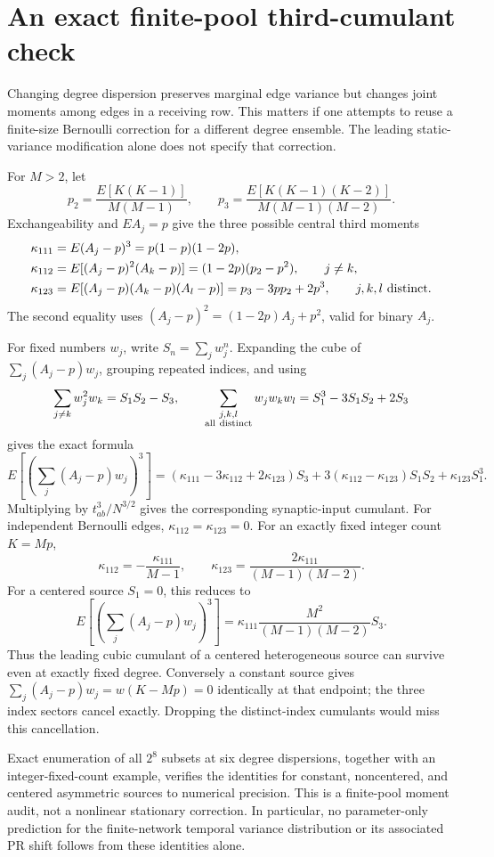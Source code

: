 \section{An exact finite-pool third-cumulant check}
\label{sec:degree-third-cumulant}

Changing degree dispersion preserves marginal edge variance but changes
joint moments among edges in a receiving row. This matters if one attempts
to reuse a finite-size Bernoulli correction for a different degree ensemble.
The leading static-variance modification alone does not specify that
correction.

For \(M>2\), let
\[
 p_2=\frac{E[K(K-1)]}{M(M-1)},\qquad
 p_3=\frac{E[K(K-1)(K-2)]}{M(M-1)(M-2)}.
\]
Exchangeability and \(E A_j=p\) give the three possible central third moments
\begin{align*}
 \kappa_{111}&=E(A_j-p)^3=p(1-p)(1-2p),\\
 \kappa_{112}&=E[(A_j-p)^2(A_k-p)]
            =(1-2p)(p_2-p^2),\qquad j\ne k,\\
 \kappa_{123}&=E[(A_j-p)(A_k-p)(A_l-p)]
            =p_3-3pp_2+2p^3,\qquad j,k,l\ {\rm distinct}.
\end{align*}
The second equality uses
\((A_j-p)^2=(1-2p)A_j+p^2\), valid for binary \(A_j\).

For fixed numbers \(w_j\), write \(S_n=\sum_jw_j^n\). Expanding the cube of
\(\sum_j(A_j-p)w_j\), grouping repeated indices, and using
\[
 \sum_{j\ne k}w_j^2w_k=S_1S_2-S_3,\qquad
 \sum_{\substack{j,k,l\\{\rm all\ distinct}}}w_jw_kw_l
 =S_1^3-3S_1S_2+2S_3
\]
gives the exact formula
\[
 E\left[\left(\sum_j(A_j-p)w_j\right)^3\right]
 =(\kappa_{111}-3\kappa_{112}+2\kappa_{123})S_3
  +3(\kappa_{112}-\kappa_{123})S_1S_2
  +\kappa_{123}S_1^3.
\]
Multiplying by \(t_{ab}^3/N^{3/2}\) gives the corresponding synaptic-input
cumulant. For independent Bernoulli edges,
\(\kappa_{112}=\kappa_{123}=0\). For an exactly fixed integer count \(K=Mp\),
\[
 \kappa_{112}=-\frac{\kappa_{111}}{M-1},\qquad
 \kappa_{123}=\frac{2\kappa_{111}}{(M-1)(M-2)}.
\]
For a centered source \(S_1=0\), this reduces to
\[
 E\left[\left(\sum_j(A_j-p)w_j\right)^3\right]
 =\kappa_{111}\frac{M^2}{(M-1)(M-2)}S_3.
\]
Thus the leading cubic cumulant of a centered heterogeneous source can
survive even at exactly fixed degree. Conversely a constant source gives
\(\sum_j(A_j-p)w_j=w(K-Mp)=0\) identically at that endpoint; the three index
sectors cancel exactly. Dropping the distinct-index cumulants would miss
this cancellation.

Exact enumeration of all \(2^8\) subsets at six degree dispersions, together
with an integer-fixed-count example, verifies the identities for constant,
noncentered, and centered asymmetric sources to numerical precision. This
is a finite-pool moment audit, not a nonlinear stationary correction. In
particular, no parameter-only prediction for the finite-network temporal
variance distribution or its associated PR shift follows from these
identities alone.
